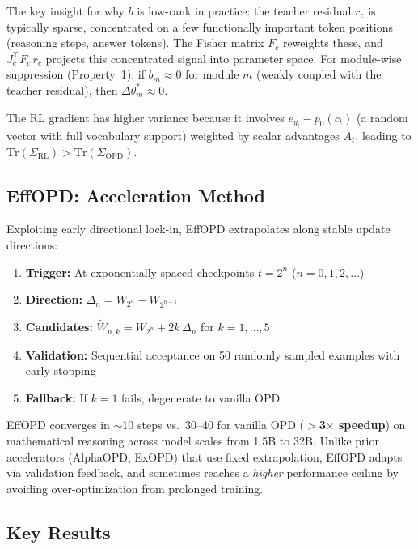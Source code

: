 \documentclass[11pt,a4paper]{article}
\begin{document}
The key insight for why $b$ is low-rank in practice: the teacher residual $r_c$ is typically sparse, concentrated on a few functionally important token positions (reasoning steps, answer tokens). The Fisher matrix $F_c$ reweights these, and $J_c^\top F_c\, r_c$ projects this concentrated signal into parameter space. For module-wise suppression (Property~1): if $b_m \approx 0$ for module $m$ (weakly coupled with the teacher residual), then $\Delta\theta_m^* \approx 0$.

The RL gradient has higher variance because it involves $e_{y_t} - p_0(c_t)$ (a random vector with full vocabulary support) weighted by scalar advantages $A_t$, leading to $\mathrm{Tr}(\Sigma_{\mathrm{RL}}) > \mathrm{Tr}(\Sigma_{\mathrm{OPD}})$.

\subsection{EffOPD: Acceleration Method}

Exploiting early directional lock-in, EffOPD extrapolates along stable update directions:
\begin{enumerate}[nosep]
\item \textbf{Trigger:} At exponentially spaced checkpoints $t = 2^n$ ($n = 0, 1, 2, \ldots$)
\item \textbf{Direction:} $\Delta_n = W_{2^n} - W_{2^{n-1}}$
\item \textbf{Candidates:} $\tilde{W}_{n,k} = W_{2^n} + 2k\,\Delta_n$ for $k = 1, \ldots, 5$
\item \textbf{Validation:} Sequential acceptance on 50 randomly sampled examples with early stopping
\item \textbf{Fallback:} If $k{=}1$ fails, degenerate to vanilla OPD
\end{enumerate}
EffOPD converges in ${\sim}$10 steps vs.\ 30--40 for vanilla OPD (\textbf{$>$3$\times$ speedup}) on mathematical reasoning across model scales from 1.5B to 32B. Unlike prior accelerators (AlphaOPD, ExOPD) that use fixed extrapolation, EffOPD adapts via validation feedback, and sometimes reaches a \textit{higher} performance ceiling by avoiding over-optimization from prolonged training.

\subsection{Key Results}
\end{document}
